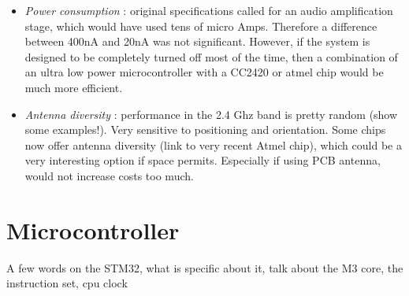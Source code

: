\begin{itemize}
  \item \emph{Power consumption} : original specifications called for an audio
    amplification stage, which would have used tens of micro Amps.
    Therefore a difference between 400nA and 20nA was not significant. However,
    if the system is designed to be completely turned off most of the time, then
    a combination of an ultra low power microcontroller with a CC2420 or atmel
    chip would be much more efficient.
  \item \emph{Antenna diversity} : performance in the 2.4 Ghz band is pretty
    random (show some examples!). Very sensitive to positioning and orientation.
    Some chips now offer antenna diversity (link to very recent Atmel chip),
    which could be a very interesting option if space permits. Especially if
    using PCB antenna, would not increase costs too much.
\end{itemize}


\section{Microcontroller}

A few words on the STM32, what is specific about it, talk about the M3 core, the
instruction set, cpu clock
